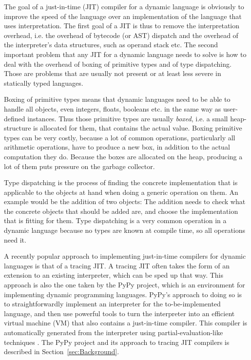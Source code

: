 \documentclass{sigplanconf}
\let\oldcite=\cite
\renewcommand\cite[1]{\ifthenelse{\equal{#1}{XXX}}{[citation~needed]}{\oldcite{#1}}}
\begin{document}
The goal of a just-in-time (JIT) compiler for a dynamic language is obviously to
improve the speed of the language over an implementation of the language that
uses interpretation. The first goal of a JIT is thus to remove the
interpretation overhead, i.e. the overhead of bytecode (or AST) dispatch and the
overhead of the interpreter's data structures, such as operand stack etc. The
second important problem that any JIT for a dynamic language needs to solve is
how to deal with the overhead of boxing of primitive types and of type
dispatching. Those are problems that are usually not present or at least less
severe in statically typed languages.

Boxing of primitive types means that dynamic languages need to be able to handle
all objects, even integers, floats, booleans etc. in the same way as user-defined
instances. Thus those primitive types are usually \emph{boxed}, i.e. a small
heap-structure is allocated for them, that contains the actual value. Boxing
primitive types can be very costly, because a lot of common operations,
particularly all arithmetic operations, have to produce a new box, in addition
to the actual computation they do. Because the boxes are allocated on the heap,
producing a lot of them puts pressure on the garbage collector.

Type dispatching is the process of finding the concrete implementation that is
applicable to the objects at hand when doing a generic operation on them. An
example would be the addition of two objects: The addition needs to check what
the concrete objects that should be added are, and choose the implementation
that is fitting for them. Type dispatching is a very common operation in a
dynamic language because no types are known at compile time, so all operations
need it.

A recently popular approach to implementing just-in-time compilers for dynamic
languages is that of a tracing JIT. A tracing JIT often takes the form of an
extension to an existing interpreter, which can be sped up that way. This
approach is also the one taken by the PyPy project, which is an environment for
implementing dynamic programming languages. PyPy's
approach to doing so is to straightforwardly implement an interpreter for the
to-be-implemented language, and then use powerful tools to turn the interpreter
into an efficient virtual machine (VM) that also contains a just-in-time compiler.
This compiler
is automatically generated from the interpreter using partial-evaluation-like
techniques \cite{bolz_tracing_2009}. The PyPy project and its approach to
tracing JIT compilers is described in Section~\ref{sec:Background}.
\end{document}
